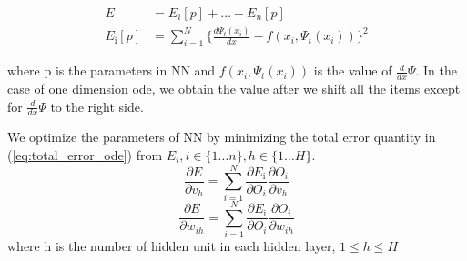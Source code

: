 \documentclass{article}
\begin{document}
\begin{equation}\label{eq:total_error_ode}
\begin{aligned}
E &= E_i[p] + \dots + E_{n}[p] \\
E_\text{i}[p] &=\sum_{i=1}^{N} \{ \frac{d \Psi_{t}(x_i)}{dx}-f(x_{i}, \Psi_{t}(x_i))\}^{2} 
\end{aligned}
\end{equation}

\medskip \noindent
where p is the parameters in NN and $f(x_i,\Psi_{t}(x_i))$ is the value of $\frac{d}{dx}\Psi$. 
In the case of one dimension ode, we obtain the value after we shift all the items except for $\frac{d}{dx}\Psi$ to the right side. 

\medskip \noindent
We optimize the parameters of NN by minimizing the total error quantity in (\ref{eq:total_error_ode}) from $E_i, i \in \{1 \dots n\}, h \in \{1 \dots H\}$. 
\begin{equation}\label{eq:weight_ode_v}
\frac{\partial E}{\partial v_{h}} = \sum_{i=1}^{N} \frac{\partial E_\text{i}}{\partial O_i} \frac{\partial O_i}{\partial v_{h}} 
\end{equation}
\begin{equation}\label{eq:weight_ode_w}
\frac{\partial E}{\partial w_{ih}} = \sum_{i=1}^{N} \frac{\partial E_\text{i}}{\partial O_i} \frac{\partial O_i}{\partial w_{ih}} 
\end{equation}
where h is the number of hidden unit in each hidden layer, $1 \leq h \leq H$
\end{document}
